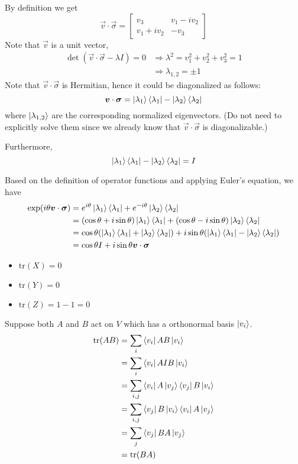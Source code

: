 \documentclass{homeworg}
\begin{document}
\exercise*
By definition we get
\[\vec v\cdot\vec \sigma=\begin{bmatrix}
v_3 & v_1-iv_2\\
v_1+iv_2 & -v_3\end{bmatrix}\]
Note that $\vec v$ is a unit vector,
\begin{align}\det(\vec v\cdot\vec \sigma-\lambda I)=0&\Rightarrow\lambda^2=v_1^2+v_2^2+v_3^2=1\nonumber\\
&\Rightarrow\lambda_{1,2}=\pm1\nonumber
\end{align}
Note that $\vec v\cdot\vec\sigma$ is Hermitian, hence it could be diagonalized as follows:
\[\bm{v}\cdot\bm{\sigma}=\ket{\lambda_1}\bra{\lambda_1}-\ket{\lambda_2}\bra{\lambda_2}\]
where $\ket{\lambda_{1,2}}$ are the corresponding normalized eigenvectors. (Do not need to explicitly solve them since we already know that $\vec v\cdot\vec\sigma$ is diagonalizable.)

Furthermore,
\[\ket{\lambda_1}\bra{\lambda_1}-\ket{\lambda_2}\bra{\lambda_2}=I\]

Based on the definition of operator functions and applying Euler's equation, we have
\begin{align}
    \exp(i\theta\bm{v}\cdot\bm{\sigma})&=e^{i\theta}\ket{\lambda_1}\bra{\lambda_1}+e^{-i\theta}\ket{\lambda_2}\bra{\lambda_2}\nonumber\\
    &=(\cos{\theta}+i\sin{\theta})\ket{\lambda_1}\bra{\lambda_1}+(\cos{\theta}-i\sin{\theta})\ket{\lambda_2}\bra{\lambda_2}\nonumber\\
    &=\cos{\theta}(\ket{\lambda_1}\bra{\lambda_1}+\ket{\lambda_2}\bra{\lambda_2})+i\sin{\theta}(\ket{\lambda_1}\bra{\lambda_1}-\ket{\lambda_2}\bra{\lambda_2})\nonumber\\
    &=\cos{\theta}I+i\sin{\theta\bm{v}\cdot\bm{\sigma}}\nonumber
\end{align}

\exercise*
\begin{itemize}
    \item $\text{tr}(X)=0$
    \item $\text{tr}(Y)=0$
    \item $\text{tr}(Z)=1-1=0$
    
\end{itemize}

\exercise*
Suppose both $A$ and $B$ act on $V$ which has a orthonormal basis $\ket{v_i}$.
\begin{align}
    \text{tr}(AB)&=\sum_i\bra{v_i}AB\ket{v_i}\nonumber\\
    &=\sum_i\bra{v_i}AIB\ket{v_i}\nonumber\\
    &=\sum_{i,j}\bra{v_i}A\ket{v_j}\bra{v_j}B\ket{v_i}\nonumber\\
    &=\sum_{i,j}\bra{v_j}B\ket{v_i}\bra{v_i}A\ket{v_j}\nonumber\\
    &=\sum_j\bra{v_j}BA\ket{v_j}\nonumber\\
    &=\text{tr}(BA)\nonumber
\end{align}
\end{document}
